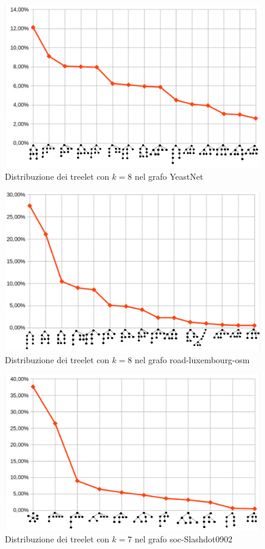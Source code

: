 \begin{figure}[htbp]
	\centering
	\includegraphics[width=\textwidth]{capitolo4/grafoYEAST}
	\caption{Distribuzione dei treelet con $ k=8 $ nel grafo YeastNet}
	\label{distr:2}
\end{figure}
\begin{figure}[htbp]
		\centering
	\includegraphics[width=\textwidth]{capitolo4/grafoROAD}	
		\caption{Distribuzione dei treelet con $ k=8 $ nel grafo road-luxembourg-osm }
		\label{distr:3}
\end{figure}
\begin{figure}[htbp]
		
	\includegraphics[width=\textwidth]{capitolo4/grafoALSH}
	\caption{Distribuzione dei treelet con $ k=7 $ nel grafo soc-Slashdot0902}
	\label{distr:4}
\end{figure}\mbox{}\\\\

